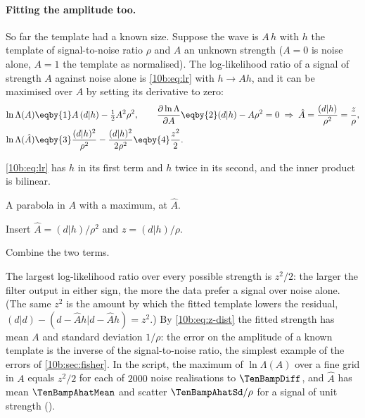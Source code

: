 \paragraph{Fitting the amplitude too.} So far the template had a known size. Suppose the wave is $A\,h$ with $h$ the
template of signal-to-noise ratio $\rho$ and $A$ an unknown strength ($A=0$ is noise alone, $A=1$ the template as
normalised). The log-likelihood ratio of a signal of strength $A$ against noise alone is \eqref{10b:eq:lr} with
$h\to Ah$, and it can be maximised over $A$ by setting its derivative to zero:
\begin{align}
  \ln\Lambda(A)
  &\eqby{1}A\,(d|h)-\tfrac12A^2\rho^2,\qquad
  \frac{\partial\ln\Lambda}{\partial A}\eqby{2}(d|h)-A\rho^2=0
  \;\Rightarrow\;\hat A=\frac{(d|h)}{\rho^2}=\frac z\rho,\nonumber\\
  \ln\Lambda(\hat A)
  &\eqby{3}\frac{(d|h)^2}{\rho^2}-\frac{(d|h)^2}{2\rho^2}
   \eqby{4}\frac{z^2}{2}.
  \label{10b:eq:amp-max}
\end{align}
\begin{explain}
  \item \eqref{10b:eq:lr} has $h$ in its first term and $h$ twice in its second, and the inner product is bilinear.
  \item A parabola in $A$ with a maximum, at $\hat A$.
  \item Insert $\hat A=(d|h)/\rho^2$ and $z=(d|h)/\rho$.
  \item Combine the two terms.
\end{explain}
The largest log-likelihood ratio over every possible strength is $z^2/2$: the larger the filter output in either
sign, the more the data prefer a signal over noise alone. (The same $z^2$ is the amount by which the fitted template
lowers the residual, $(d|d)-(d-\hat Ah|d-\hat Ah)=z^2$.) By \eqref{10b:eq:z-dist} the fitted strength has mean $A$ and
standard deviation $1/\rho$: the error on the amplitude of a known template is the inverse of the signal-to-noise
ratio, the simplest example of the errors of \cref{10b:sec:fisher}. In the script, the maximum of $\ln\Lambda(A)$ over a
fine grid in $A$ equals $z^2/2$ for each of $2000$ noise realisations to $\TenBampDiff$, and $\hat A$ has mean
$\TenBampAhatMean$ and scatter $\TenBampAhatSd/\rho$ for a signal of unit strength ().

